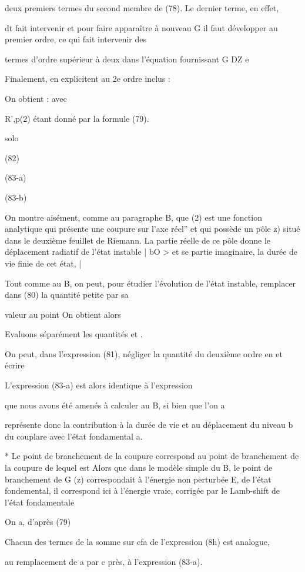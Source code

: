deux premiers termes du second membre de (78). Le dernier terme, en effet,

dt
fait intervenir  et pour faire apparaître à nouveau G il
faut développer au premier ordre, ce qui fait intervenir des

termes d'ordre supérieur à deux dans l'équation fournissant G DZ e

Finalement, en explicitent au 2e ordre inclus :

On obtient :
 avec

R',p(2) étant donné par la formule (79).

solo

(82)

(83-a)

(83-b)

On montre aisément, comme au paragraphe B, que (2) est une
fonction analytique qui présente une coupure sur l'axe réel” et qui possède
un pôle z) situé dans le deuxième feuillet de Riemann. La partie réelle de
ce pôle donne le déplacement radiatif de l'état instable | bO > et se partie imaginaire, la durée de vie finie de cet état, |

Tout comme au  B, on peut, pour étudier l'évolution de l'état
instable, remplacer dans (80) la quantité petite  par sa

valeur au point  On obtient alors

Evaluons séparément les quantités  et .

On peut, dans l'expression (81), négliger la quantité du
deuxième ordre en  et écrire

L'expression (83-a) est alors identique à l'expression

que nous avons été amenés à calculer au  B, si bien que l'on a

représente donc la contribution à la durée de vie et au déplacement du niveau b du couplare avec l’état fondamental a.

* Le point de branchement de la coupure correspond au point de branchement de
la coupure de  lequel est Alors que dans le modèle simple
du  B, le point de branchement de G (z) correspondait à l'énergie non perturbée
E, de l'état fondemental, il correspond ici à l'énergie vraie, corrigée par le
Lamb-shift de l'état fondamentale


On a, d'après (79)

Chacun des termes de la somme sur cfa de l'expression (8h) est analogue,

au remplacement de a par c près, à l'expression (83-a).

